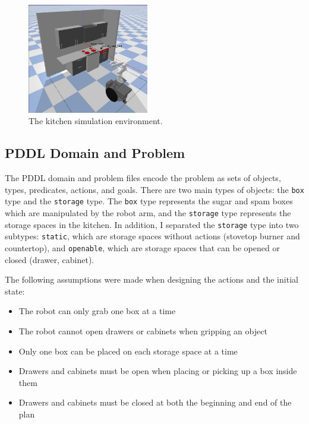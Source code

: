 \documentclass{article}
\begin{document}
\begin{figure}[h]
    \centering
    \includegraphics[width=200px]{sim_env.jpg}
    \caption{The kitchen simulation environment.}
    \label{fig:sim_env}
\end{figure}
\fi

\subsection{PDDL Domain and Problem}

The PDDL domain and problem files encode the problem as sets of objects, types, predicates, actions, and goals. There are two main types of objects: the \texttt{box} type and the \texttt{storage} type. The \texttt{box} type represents the sugar and spam boxes which are manipulated by the robot arm, and the \texttt{storage} type represents the storage spaces in the kitchen. In addition, I separated the \texttt{storage} type into two subtypes: \texttt{static}, which are storage spaces without actions (stovetop burner and countertop), and \texttt{openable}, which are storage spaces that can be opened or closed (drawer, cabinet).

The following assumptions were made when designing the actions and the initial state:
\begin{itemize}
    \item The robot can only grab one box at a time
    \item The robot cannot open drawers or cabinets when gripping an object
    \item Only one box can be placed on each storage space at a time
    \item Drawers and cabinets must be open when placing or picking up a box inside them
    \item Drawers and cabinets must be closed at both the beginning and end of the plan 
\end{itemize}
\end{document}
